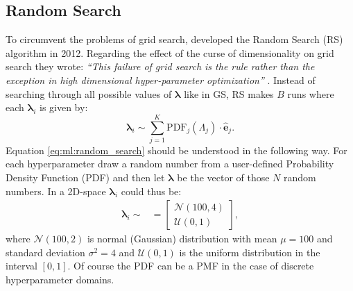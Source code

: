 \subsection{Random Search}
\label{subsec:ml:random_search}

To circumvent the problems of grid search, \citet{bergstraRandomSearchHyperparameter2012} developed the Random Search (RS) algorithm in 2012. Regarding the effect of the curse of dimensionality on grid search they wrote: \emph{``This failure of grid search is the rule rather than the exception in high dimensional hyper-parameter optimization''} \citep{bergstraRandomSearchHyperparameter2012}. Instead of searching through all possible values of $\bm{\lambda}$ like in GS, RS makes $B$ runs where each $\bm{\lambda}_i$ is given by:
\begin{equation}
  \label{eq:ml:random_search}
  \bm{\lambda}_i \sim \sum_{j=1}^K  \mathrm{PDF}_j(\Lambda_j) \cdot \bm{\hat{e}}_j  .
\end{equation}
Equation \eqref{eq:ml:random_search} should be understood in the following way. For each hyperparameter draw a random number from a user-defined Probability Density Function (PDF) and then let $\bm{\lambda}$ be the vector of those $N$ random numbers. In a 2D-space $\bm{\lambda}_i$ could thus be: 
\begin{align}
  \bm{\lambda}_i \sim &= \begin{bmatrix}
      \mathcal{N}(100, 4) \\
      \mathcal{U}(0, 1)
       \end{bmatrix},
\end{align}
where $\mathcal{N}(100, 2)$ is normal (Gaussian) distribution with mean $\mu=100$ and standard deviation $\sigma^2=4$ and $\mathcal{U}(0, 1)$ is the uniform distribution in the interval $[0, 1]$. Of course the PDF can be a PMF in the case of discrete hyperparameter domains.

